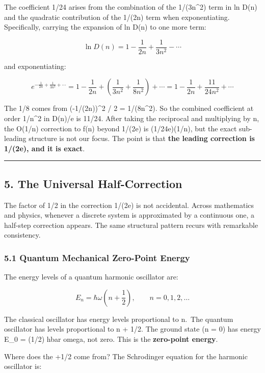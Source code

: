 \documentclass[
]{article}
\begin{document}
The coefficient 1/24 arises from the combination of the 1/(3n\^{}2) term
in ln D(n) and the quadratic contribution of the 1/(2n) term when
exponentiating. Specifically, carrying the expansion of ln D(n) to one
more term:

\[\ln D(n) = 1 - \frac{1}{2n} + \frac{1}{3n^2} - \cdots\]

and exponentiating:

\[e^{-\frac{1}{2n} + \frac{1}{3n^2} + \cdots} = 1 - \frac{1}{2n} + \left(\frac{1}{3n^2} + \frac{1}{8n^2}\right) + \cdots = 1 - \frac{1}{2n} + \frac{11}{24n^2} + \cdots\]

The 1/8 comes from (-1/(2n))\^{}2 / 2 = 1/(8n\^{}2). So the combined
coefficient at order 1/n\^{}2 in D(n)/e is 11/24. After taking the
reciprocal and multiplying by n, the O(1/n) correction to f(n) beyond
1/(2e) is (1/24e)(1/n), but the exact sub-leading structure is not our
focus. The point is that \textbf{the leading correction is 1/(2e), and
it is exact}.

\begin{center}\rule{0.5\linewidth}{0.5pt}\end{center}

\subsection{5. The Universal
Half-Correction}\label{the-universal-half-correction}

The factor of 1/2 in the correction 1/(2e) is not accidental. Across
mathematics and physics, whenever a discrete system is approximated by a
continuous one, a half-step correction appears. The same structural
pattern recurs with remarkable consistency.

\subsubsection{5.1 Quantum Mechanical Zero-Point
Energy}\label{quantum-mechanical-zero-point-energy}

The energy levels of a quantum harmonic oscillator are:

\[E_n = \hbar\omega\!\left(n + \frac{1}{2}\right), \qquad n = 0, 1, 2, \ldots\]

The classical oscillator has energy levels proportional to n.~The
quantum oscillator has levels proportional to n + 1/2. The ground state
(n = 0) has energy E\_0 = (1/2) hbar omega, not zero. This is the
\textbf{zero-point energy}.

Where does the +1/2 come from? The Schrodinger equation for the harmonic
oscillator is:
\end{document}
